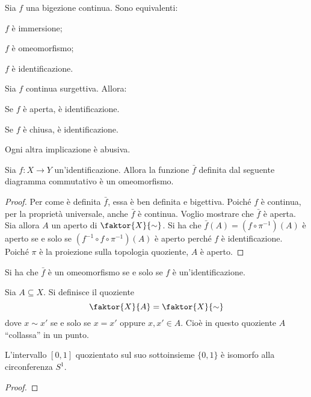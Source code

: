 \begin{oss}
    Sia $f$ una bigezione continua. Sono equivalenti:
    \begin{nlist}
        \item $f$ \`e immersione;
        \item $f$ \`e omeomorfismo;
        \item $f$ \`e identificazione.
    \end{nlist}
\end{oss}

\begin{oss}
    Sia $f$ continua surgettiva. Allora:
    \begin{nlist}
        \item Se $f$ \`e aperta, \`e identificazione.
        \item Se $f$ \`e chiusa, \`e identificazione.
        \item Ogni altra implicazione \`e abusiva.
    \end{nlist}
\end{oss}

\begin{prop}
    Sia $f\colon X \longrightarrow Y$ un'identificazione. Allora la funzione $\bar{f}$ definita dal seguente diagramma commutativo \`e un omeomorfismo.

    \begin{center}
    \end{center}
\end{prop}
\begin{proof}
    Per come \`e definita $\bar{f}$, essa \`e ben definita e bigettiva. Poich\'e $f$ \`e continua, per la propriet\`a universale, anche $\bar{f}$ \`e continua. Voglio mostrare che $\bar{f}$ \`e aperta. Sia allora $A$ un aperto di $\faktor{X}{\sim}$. Si ha che $\bar{f}(A)=(f\circ \pi^{-1})(A)$ \`e aperto se e solo se ${ (f^{-1} \circ f \circ \pi ^{-1})(A)}$ \`e aperto perch\'e $f$ \`e identificazione. Poich\'e $\pi$ \`e la proiezione sulla topologia quoziente, $A$ \`e aperto.
\end{proof}

\begin{oss}
    Si ha che $\bar{f}$ \`e un omeomorfismo se e solo se $f$ \`e un'identificazione.
\end{oss}

\begin{defn}
    Sia $A \subseteq X$. Si definisce il quoziente
    \[
    \faktor{X}{A} = \faktor{X}{\sim}
    \]
    dove $x\sim x'$ se e solo se $x = x'$ oppure $x,x'\in A$. Cio\`e in questo quoziente $A$ ``collassa'' in un punto.
\end{defn}

\begin{ex}
    L'intervallo $[0, 1]$ quozientato sul suo sottoinsieme $\{0,1\}$ \`e isomorfo alla circonferenza $S^1$.
\end{ex}
\begin{proof}
\end{proof}
